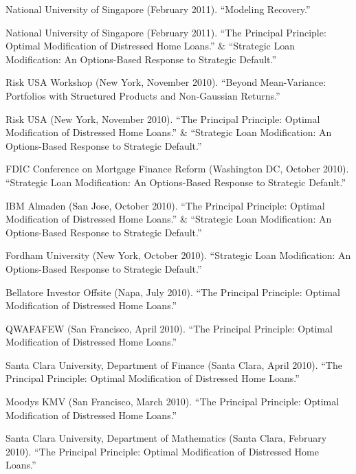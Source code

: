 \documentclass{article}
\begin{document}
\begin{etaremune}
{\item National University of Singapore (February 2011). 
``Modeling Recovery.''

\item National University of Singapore (February 2011). 
``The Principal Principle: Optimal Modification of Distressed Home Loans.'' \& ``Strategic Loan Modification: An Options-Based Response to Strategic Default.''

\item Risk USA Workshop (New York, November 2010). 
``Beyond Mean-Variance: Portfolios with Structured Products  and Non-Gaussian Returns.''

\item Risk USA (New York, November 2010). 
``The Principal Principle: Optimal Modification of Distressed Home Loans.'' \& ``Strategic Loan Modification: An Options-Based Response to Strategic Default.''

\item FDIC Conference on Mortgage Finance Reform (Washington DC, October 2010). 
``Strategic Loan Modification: An Options-Based Response to Strategic Default.''

\item IBM Almaden (San Jose, October 2010). 
``The Principal Principle: Optimal Modification of Distressed Home Loans.'' \& ``Strategic Loan Modification: An Options-Based Response to Strategic Default.''

\item Fordham University (New York, October 2010). 
``Strategic Loan Modification: An Options-Based Response to Strategic Default.''

\item Bellatore Investor Offsite (Napa, July 2010).
``The Principal Principle: Optimal Modification of Distressed Home Loans.''

\item QWAFAFEW (San Francisco, April 2010).
``The Principal Principle: Optimal Modification of Distressed Home Loans.''

\item Santa Clara University, Department of Finance (Santa Clara, April 2010).
``The Principal Principle: Optimal Modification of Distressed Home Loans.''

\item Moodys KMV (San Francisco, March 2010).
``The Principal Principle: Optimal Modification of Distressed Home Loans.''

\item Santa Clara University, Department of Mathematics (Santa Clara, February 2010).
``The Principal Principle: Optimal Modification of Distressed Home Loans.''

}
\end{etaremune}
\end{document}
